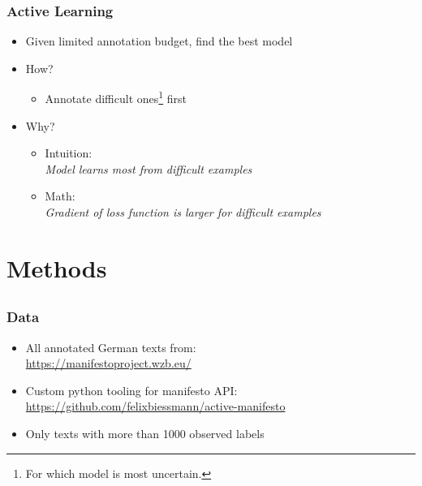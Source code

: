 \documentclass[]{beamer}
\begin{document}
\begin{frame}\frametitle{Active Learning}
\begin{itemize}[<+->]
\item Given limited annotation budget, find the best model
\item How? \\
\begin{itemize}
\item Annotate difficult ones\footnote{For which model is most uncertain.} first
\end{itemize}
\item Why?
\begin{itemize}
\item Intuition: \\
\textit{ Model learns most from difficult examples}\\
\item Math:\\
\textit{ Gradient of loss function is larger for difficult examples }\\
\end{itemize}
\end{itemize}
\end{frame}

\section{Methods}
\subsection{}

\begin{frame}\frametitle{Data}

\begin{itemize}
\item All annotated German texts from:\\ 
\url{https://manifestoproject.wzb.eu/} 
\item Custom python tooling for manifesto API:\\
{\footnotesize \url{https://github.com/felixbiessmann/active-manifesto} }\\
\item Only texts with more than 1000 observed labels
\end{itemize}
\end{frame}
\end{document}
